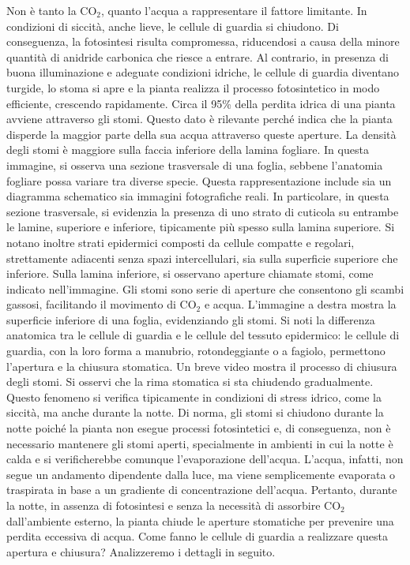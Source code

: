 \documentclass[11pt, a4paper]{article}
\begin{document}
\begin{spacing}{1}
Non è tanto la $\text{CO}_2$, quanto l'acqua a rappresentare il fattore limitante. In condizioni di siccità, anche lieve, le cellule di guardia si chiudono. Di conseguenza, la fotosintesi risulta compromessa, riducendosi a causa della minore quantità di anidride carbonica che riesce a entrare. Al contrario, in presenza di buona illuminazione e adeguate condizioni idriche, le cellule di guardia diventano turgide, lo stoma si apre e la pianta realizza il processo fotosintetico in modo efficiente, crescendo rapidamente. Circa il 95\% della perdita idrica di una pianta avviene attraverso gli stomi. Questo dato è rilevante perché indica che la pianta disperde la maggior parte della sua acqua attraverso queste aperture. La densità degli stomi è maggiore sulla faccia inferiore della lamina fogliare.
In questa immagine, si osserva una sezione trasversale di una foglia, sebbene l'anatomia fogliare possa variare tra diverse specie. Questa rappresentazione include sia un diagramma schematico sia immagini fotografiche reali. In particolare, in questa sezione trasversale, si evidenzia la presenza di uno strato di cuticola su entrambe le lamine, superiore e inferiore, tipicamente più spesso sulla lamina superiore. Si notano inoltre strati epidermici composti da cellule compatte e regolari, strettamente adiacenti senza spazi intercellulari, sia sulla superficie superiore che inferiore. Sulla lamina inferiore, si osservano aperture chiamate stomi, come indicato nell'immagine.
Gli stomi sono serie di aperture che consentono gli scambi gassosi, facilitando il movimento di $\text{CO}_2$ e acqua. L'immagine a destra mostra la superficie inferiore di una foglia, evidenziando gli stomi. Si noti la differenza anatomica tra le cellule di guardia e le cellule del tessuto epidermico: le cellule di guardia, con la loro forma a manubrio, rotondeggiante o a fagiolo, permettono l'apertura e la chiusura stomatica. Un breve video mostra il processo di chiusura degli stomi.
Si osservi che la rima stomatica si sta chiudendo gradualmente. Questo fenomeno si verifica tipicamente in condizioni di stress idrico, come la siccità, ma anche durante la notte. Di norma, gli stomi si chiudono durante la notte poiché la pianta non esegue processi fotosintetici e, di conseguenza, non è necessario mantenere gli stomi aperti, specialmente in ambienti in cui la notte è calda e si verificherebbe comunque l'evaporazione dell'acqua. L'acqua, infatti, non segue un andamento dipendente dalla luce, ma viene semplicemente evaporata o traspirata in base a un gradiente di concentrazione dell'acqua. Pertanto, durante la notte, in assenza di fotosintesi e senza la necessità di assorbire $\text{CO}_2$ dall'ambiente esterno, la pianta chiude le aperture stomatiche per prevenire una perdita eccessiva di acqua. Come fanno le cellule di guardia a realizzare questa apertura e chiusura? Analizzeremo i dettagli in seguito.

\end{spacing}
\end{document}
